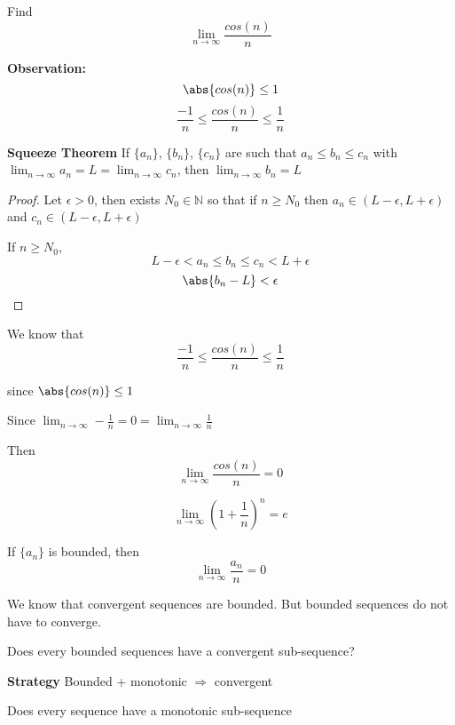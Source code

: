 

\begin{exmp}
Find $$\lim_{n\to\infty} \frac{cos(n)}{n}$$
\end{exmp}
\textbf{Observation: } 
\[\abs{cos(n)} \leq 1\]
\[\frac{-1}{n} \leq \frac{cos(n)}{n}\leq \frac{1}{n}\]


\begin{thm}\textbf{Squeeze Theorem}
If $\{a_n\}$, $\{b_n\}$, $\{c_n\}$ are such that $a_n\leq b_n\leq c_n$ with $\lim_{n\to\infty} a_n = L = \lim_{n\to\infty} c_n$, then $\lim_{n\to\infty} b_n = L$
\end{thm}

\begin{proof}
Let $\epsilon > 0$, then exists $N_0\in\mathbb{N}$ so that if $n\geq N_0$ then $a_n \in (L-\epsilon,L+\epsilon)$ and $c_n \in (L-\epsilon,L+\epsilon)$

If $n\geq N_0$, \[L-\epsilon < a_n \leq b_n \leq c_n < L+\epsilon\]
\[\abs{b_n - L} < \epsilon\]
\end{proof}

\begin{solution}

We know that \[\frac{-1}{n} \leq \frac{cos(n)}{n}\leq \frac{1}{n}\]

since $\abs{cos(n)} \leq 1$

Since $\lim_{n\to\infty} -\frac{1}{n} = 0 = \lim_{n\to \infty} \frac{1}{n}$

Then 
\[\lim_{n\to\infty} \frac{cos(n)}{n} = 0\]


\end{solution}

\begin{exmp}
\[
\lim_{n\to\infty} (1+\frac{1}{n})^n = e
\]
\end{exmp}

\begin{note}
If $\{a_n\}$ is bounded, then 
\[
\lim_{n\to\infty} \frac{a_n}{n} = 0
\]
\end{note}


\begin{note}
We know that convergent sequences are bounded. But bounded sequences do not have to converge.

Does every bounded sequences have a convergent sub-sequence?



\textbf{Strategy} Bounded + monotonic $\Rightarrow$ convergent

Does every sequence have a monotonic sub-sequence

\end{note}

